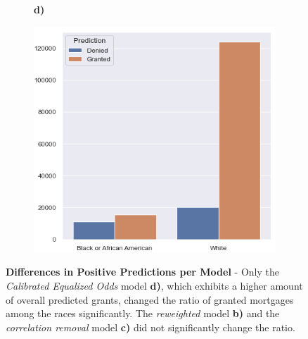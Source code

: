 \begin{figure}[!htbp]
\begin{minipage}[b]{0.5\textwidth}
\begin{subfigure}[t]{0.9\textwidth}
        \end{subfigure}
    \end{minipage}%
    \begin{minipage}[b]{0.5\textwidth}
        \centering
        \begin{subfigure}[t]{0.06\textwidth}
            \textbf{d)}
        \end{subfigure}
        \begin{subfigure}[t]{0.9\textwidth}
            \includegraphics[width=\linewidth, valign=t]{images/loan_grants_by_protected_attributes/calibrated_eqodds.png}
        \end{subfigure}
    \end{minipage}%
    \caption[Differences in Positive Predictions per Model]{\textbf{Differences in Positive Predictions per Model} - Only the \textit{Calibrated Equalized Odds} model \textbf{d)}, which exhibits a higher amount of overall predicted grants, changed the ratio of granted mortgages among the races significantly.
    The \textit{reweighted} model \textbf{b)} and the \textit{correlation removal} model \textbf{c)} did not significantly change the ratio.}
    \label{fig:Bar_Grant_per_Race}

\end{figure}

